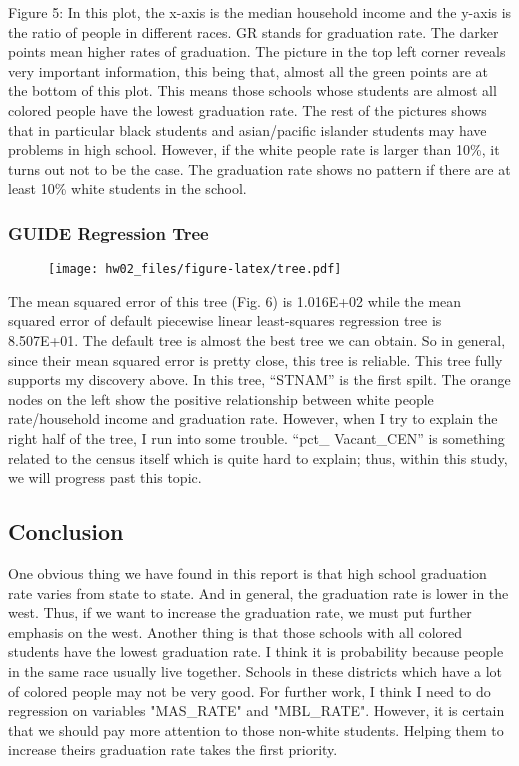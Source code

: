 \documentclass[]{article}
\begin{document}
Figure 5: In this plot, the x-axis is the median household income and
the y-axis is the ratio of people in different races. GR stands for
graduation rate. The darker points mean higher rates of graduation. The
picture in the top left corner reveals very important information, this
being that, almost all the green points are at the bottom of this plot.
This means those schools whose students are almost all colored people
have the lowest graduation rate. The rest of the pictures shows that in
particular black students and asian/pacific islander students may have
problems in high school. However, if the white people rate is larger
than 10\%, it turns out not to be the case. The graduation rate shows no
pattern if there are at least 10\% white students in the school.

\subsubsection{GUIDE Regression Tree}\label{guide-regression-tree}

\begin{figure}[H]
\centering
\texttt{[image: hw02\_files/figure-latex/tree.pdf]}
\caption{}
\end{figure}

The mean squared error of this tree (Fig. 6) is 1.016E+02 while the mean squared
error of default piecewise linear least-squares regression tree is
8.507E+01. The default tree is almost the best tree we can obtain. So in
general, since their mean squared error is pretty close, this tree is
reliable. This tree fully supports my discovery above. In this tree,
``STNAM'' is the first spilt. The orange nodes on the left show the
positive relationship between white people rate/household income and
graduation rate. However, when I try to explain the right half of the
tree, I run into some trouble.  ``pct\_ Vacant\_CEN'' is something related to the census itself which is quite hard to explain; thus, within this study, we will progress past this topic.

\subsection{Conclusion}\label{conclusion}

One obvious thing we have found in this report is that high
school graduation rate varies from state to state. And in general, the
graduation rate is lower in the west. Thus, if we want to increase the
graduation rate, we must put further emphasis on the west. Another thing
is that those schools with all colored students have the lowest
graduation rate. I think it is probability because people in the same race usually live together. Schools in these districts which have a lot of colored people may not be very good. For further work, I think I need to do regression on variables "MAS\_RATE" and "MBL\_RATE". However, it is certain that we should pay more attention to those non-white students. Helping them to increase theirs graduation rate takes the first priority.
\end{document}
